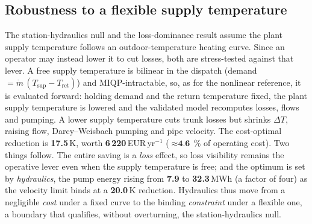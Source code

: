 \documentclass[a4paper,fleqn]{cas-sc}
\begin{document}
\subsection{Robustness to a flexible supply temperature}
\label{subsec:tsup}
The station-hydraulics null and the loss-dominance result assume the plant supply temperature
follows an outdoor-temperature heating curve. Since an operator may instead lower it to cut
losses, both are stress-tested against that lever. A free supply temperature is bilinear in the
dispatch (demand $=\dot m\,(T_\text{sup}-T_\text{ret})$) and MIQP-intractable, so, as for the
nonlinear reference, it is evaluated forward: holding demand and the return temperature fixed,
the plant supply temperature is lowered and the validated model recomputes losses, flows and
pumping. A lower supply temperature cuts trunk losses but shrinks $\Delta T$, raising flow,
Darcy--Weisbach pumping and pipe velocity. The cost-optimal reduction is
\textbf{17.5}\,K, worth \textbf{6\,220}\,EUR\,yr$^{-1}$
($\approx\textbf{4.6}$\,\% of operating cost). Two things follow. The entire
saving is a \emph{loss} effect, so loss visibility remains the operative lever even when the
supply temperature is free; and the optimum is set by \emph{hydraulics}, the pump energy rising
from \textbf{7.9} to \textbf{32.3}\,MWh (a factor of four) as the
velocity limit binds at a \textbf{20.0}\,K reduction. Hydraulics thus move from
a negligible \emph{cost} under a fixed curve to the binding \emph{constraint} under a flexible
one, a boundary that qualifies, without overturning, the station-hydraulics null.

\end{document}
